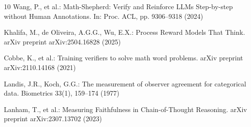 \documentclass[runningheads]{llncs}
\begin{document}
\begin{thebibliography}{10}
Wang, P., et al.: Math-Shepherd: Verify and Reinforce LLMs Step-by-step without Human Annotations. In: Proc. ACL, pp. 9306--9318 (2024)

Khalifa, M., de Oliveira, A.G.G., Wu, E.X.: Process Reward Models That Think. arXiv preprint arXiv:2504.16828 (2025)

Cobbe, K., et al.: Training verifiers to solve math word problems. arXiv preprint arXiv:2110.14168 (2021)

Landis, J.R., Koch, G.G.: The measurement of observer agreement for categorical data. Biometrics 33(1), 159--174 (1977)

Lanham, T., et al.: Measuring Faithfulness in Chain-of-Thought Reasoning. arXiv preprint arXiv:2307.13702 (2023)

\end{thebibliography}
\end{document}
